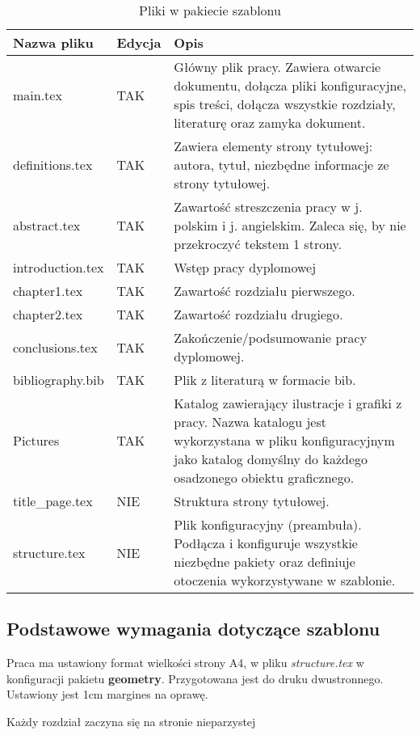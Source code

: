\begin{table}[h]
\centering
\caption{Pliki w pakiecie szablonu}
\begin{tabular}{p{}|p{} | p{}}
\toprule
\textbf{Nazwa pliku}& \textbf{Edycja}  & \textbf{Opis}\\
\midrule
main.tex &TAK& Główny plik pracy. Zawiera otwarcie dokumentu, dołącza pliki konfiguracyjne, spis treści, dołącza wszystkie rozdziały, literaturę oraz zamyka dokument.  \\
definitions.tex &TAK& Zawiera elementy strony tytułowej: autora, tytuł, niezbędne informacje ze strony tytułowej.\\
abstract.tex &TAK& Zawartość streszczenia pracy w j. polskim i j. angielskim. Zaleca się, by nie przekroczyć tekstem 1 strony.\\
introduction.tex&TAK & Wstęp pracy dyplomowej\\
chapter1.tex &TAK& Zawartość rozdziału pierwszego.  \\
chapter2.tex  &TAK& Zawartość rozdziału drugiego.  \\
conclusions.tex &TAK& Zakończenie/podsumowanie pracy dyplomowej.\\
bibliography.bib &TAK & Plik z literaturą w formacie bib.  \\
Pictures  &TAK & Katalog zawierający ilustracje i  grafiki z pracy. Nazwa katalogu jest wykorzystana w pliku konfiguracyjnym jako katalog domyślny do każdego osadzonego obiektu graficznego.  \\
title\_page.tex&NIE & Struktura strony tytułowej.\\
structure.tex  &NIE& Plik konfiguracyjny (preambuła). Podłącza i konfiguruje wszystkie niezbędne pakiety oraz definiuje otoczenia wykorzystywane w szablonie. \\
\bottomrule
\end{tabular}
\label{tab:1} 
\end{table}

\subsection{Podstawowe wymagania dotyczące szablonu}

Praca ma ustawiony format wielkości strony A4, w pliku {\em structure.tex} w konfiguracji pakietu {\bf geometry}. Przygotowana jest do druku dwustronnego. Ustawiony jest 1cm margines na oprawę.

 Każdy rozdział zaczyna się na stronie nieparzystej


